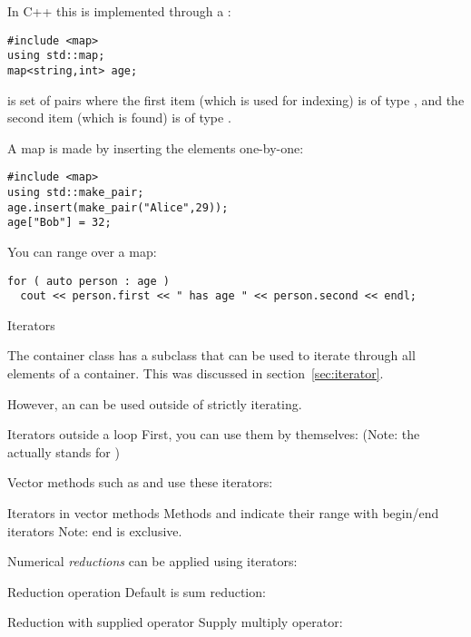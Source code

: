 In C++ this is implemented through a :
\begin{lstlisting}
#include <map>
using std::map;
map<string,int> age;
\end{lstlisting}
is set of
pairs where the first item (which is used for indexing) is of type
, and the second item (which is found) is of type .

A map is made by inserting the elements one-by-one:
\begin{lstlisting}
#include <map>
using std::make_pair;
age.insert(make_pair("Alice",29));
age["Bob"] = 32;
\end{lstlisting}

You can range over a map:
\begin{lstlisting}
for ( auto person : age )
  cout << person.first << " has age " << person.second << endl;
\end{lstlisting}

 {Iterators}
\label{sec:iterator}

The container class has a subclass  that can be
used to iterate through all elements of a container. This was
discussed in section~\ref{sec:iterator}.

However, an  can be used outside of strictly iterating.
\begin{block}{Iterators outside a loop}
  \label{sl:vec-iterator}
  First, you can use them by themselves:
  (Note: the  actually stands for )
\end{block}

Vector methods such as  and  use
these iterators:
\begin{block}{Iterators in vector methods}
  \label{sl:vec-erase}
  Methods  and  indicate their range with begin/end
  iterators
  Note: end is exclusive.
\end{block}

Numerical \emph{reductions} can be applied using iterators:
\begin{block}{Reduction operation}
  \label{sl:vec-accumulate}
  Default is sum reduction:
\end{block}

\begin{block}{Reduction with supplied operator}
  \label{sl:vec-multiplies}
  Supply multiply operator:
\end{block}

